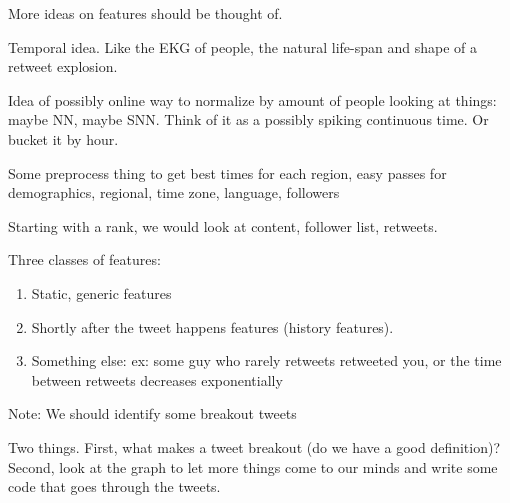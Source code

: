 More ideas on features should be thought of.

Temporal idea. Like the EKG of people, the natural life-span and shape of a retweet explosion.

Idea of possibly online way to normalize by amount of people looking at things: maybe NN, maybe SNN. Think of it as a possibly spiking continuous time. Or bucket it by hour.

Some preprocess thing to get best times for each region, easy passes for demographics, regional, time zone, language, followers

Starting with a rank, we would look at content, follower list, retweets.

Three classes of features:

\begin{enumerate}
\item Static, generic features
\item Shortly after the tweet happens features (history features).
\item Something else: ex: some guy who rarely retweets retweeted you, or the time between retweets decreases exponentially
\end{enumerate}

Note: We should identify some breakout tweets

Two things. First, what makes a tweet breakout (do we have a good definition)? Second, look at the graph to let more things come to our minds and write some code that goes through the tweets.
